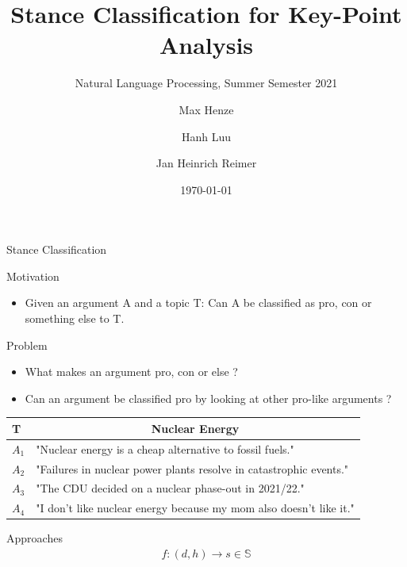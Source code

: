 \documentclass[english,handout]{mlutalk}
\title{Stance Classification for Key-Point Analysis}
\subtitle{Natural Language Processing, Summer Semester 2021}
\author{Max Henze \and Hanh Luu \and Jan Heinrich Reimer}
\institute{Martin Luther University Halle-Wittenberg}
\date{\today}
\begin{document}
\titleframe

\begin{frame}{Stance Classification} 
  \begin{block}{Motivation}
    \begin{itemize}
      \item Given an argument A and a topic T: Can A be classified as pro, con or something else to T.
    \end{itemize}
  \end{block}
  \begin{block}{Problem}
    \begin{itemize}
      \item What makes an argument pro, con or else ? 
      \item Can an argument be classified pro by looking at other pro-like arguments ?
    \end{itemize}
  \end{block}
  \begin{example}
    \begin{tabular}{l|l}
      T & \multicolumn{1}{c}{Nuclear Energy}\\
      \hline
      $A_1$ & "Nuclear energy is a cheap alternative to fossil fuels."\\
      $A_2$ & "Failures in nuclear power plants resolve in catastrophic events."\\
      $A_3$ & "The CDU decided on a nuclear phase-out in 2021/22."\\
      $A_4$ & "I don't like nuclear energy because my mom also doesn't like it."
    \end{tabular}
  \end{example}
\end{frame}

\begin{frame}{Approaches} %
   \begin{align*}
       f: (d,h) \rightarrow s \in \mathbb{S}
   \end{align*}
\end{frame}
\end{document}
